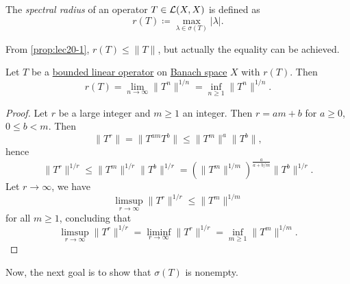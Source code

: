 \begin{definition}\label{def:spectral-radius}
	The \emph{spectral radius} of an operator \(T\in \mathcal{\MakeUppercase{l}} (X, X)\) is defined as
	\[
		r(T) \coloneqq \max _{\lambda\in \sigma (T) }\vert \lambda \vert .
	\]
\end{definition}

From \autoref{prop:lec20-1}, \(r(T) \leq \lVert T \rVert \), but actually the equality can be achieved.

\begin{proposition}
	Let \(T\) be a \hyperref[def:bounded-linear-op]{bounded linear operator} on \hyperref[def:Banach-space]{Banach space} \(X\) with \(r(T)\). Then
	\[
		r(T) = \lim_{n \to \infty} \lVert T^n \rVert ^{1 / n} = \inf _{n\geq 1}\lVert T^n \rVert ^{1 / n}.
	\]
\end{proposition}
\begin{proof}
	Let \(r\) be a large integer and \(m\geq 1\) an integer. Then \(r = am+b\) for \(a \geq 0\), \(0 \leq b < m\). Then
	\[
		\lVert T^r \rVert
		= \lVert T^{am} T^b\rVert
		\leq \lVert T^m \rVert ^a \lVert T^b \rVert,
	\]
	hence
	\[
		\lVert T^r \rVert ^{1 / r}
		\leq \lVert T^m \rVert ^{1 / r} \lVert T^b \rVert ^{1 / r}
		= \left( \lVert T^m \rVert ^{1 / m} \right) ^{\frac{a}{a+ b / m}} \lVert T^b \rVert ^{1 / r}.
	\]
	Let \(r \to \infty \), we have
	\[
		\limsup_{r \to \infty} \lVert T^r \rVert ^{1 / r}
		\leq \lVert T^m \rVert ^{1 / m}
	\]
	for all \(m \geq 1\), concluding that
	\[
		\limsup_{r \to \infty} \lVert T^r \rVert ^{1 / r}
		= \liminf_{r \to \infty} \lVert T^r \rVert ^{1 / r}
		= \inf _{m\geq 1}\lVert T^m \rVert ^{1 / m}.
	\]
\end{proof}

Now, the next goal is to show that \(\sigma (T)\) is nonempty.